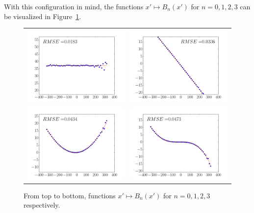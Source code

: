 \documentclass[9pt,technote]{IEEEtran}
\numberwithin{equation}{section}
\begin{document}
With this configuration in mind, the functions $x' \mapsto B_n(x')$ for $n = 0,1,2,3$ can be visualized in Figure~\ref{fig:Bnx}.
\begin{figure}[!ht]
	\centering
	\begin{tabular}{cc}
	\includegraphics[width=85mm]{figs/B0.png} &
	\includegraphics[width=85mm]{figs/B1.png} \\
	\includegraphics[width=85mm]{figs/B2.png} &
	\includegraphics[width=85mm]{figs/B3.png} 
	\end{tabular}
	\caption{From top to bottom, functions $x' \mapsto B_n(x')$ for $n = 0,1,2,3$ respectively.\label{fig:Bnx}}
\end{figure}





\end{document}
